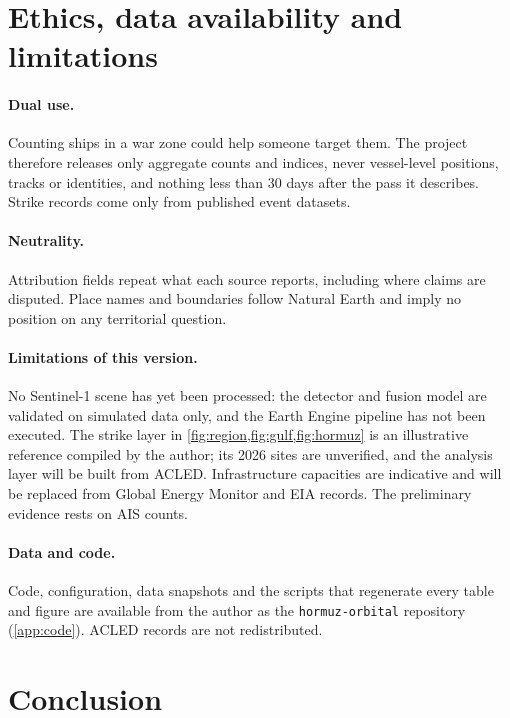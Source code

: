 \documentclass{article}
\begin{document}
\FloatBarrier
\section{Ethics, data availability and limitations}
\label{sec:ethics}

\paragraph{Dual use.} Counting ships in a war zone could help someone target them. The project therefore releases only aggregate counts and indices, never vessel-level positions, tracks or identities, and nothing less than 30 days after the pass it describes. Strike records come only from published event datasets.

\paragraph{Neutrality.} Attribution fields repeat what each source reports, including where claims are disputed. Place names and boundaries follow Natural Earth and imply no position on any territorial question.

\paragraph{Limitations of this version.} No Sentinel-1 scene has yet been processed: the detector and fusion model are validated on simulated data only, and the Earth Engine pipeline has not been executed. The strike layer in \cref{fig:region,fig:gulf,fig:hormuz} is an illustrative reference compiled by the author; its 2026 sites are unverified, and the analysis layer will be built from ACLED. Infrastructure capacities are indicative and will be replaced from Global Energy Monitor and EIA records. The preliminary evidence rests on AIS counts.

\paragraph{Data and code.} Code, configuration, data snapshots and the scripts that regenerate every table and figure are available from the author as the \texttt{hormuz-orbital} repository (\cref{app:code}). ACLED records are not redistributed.

\section{Conclusion}
\label{sec:conclusion}
\end{document}
